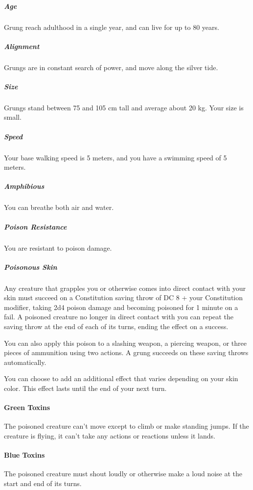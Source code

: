     \subparagraph{Age} Grung reach adulthood in a single year, and can live for up to 80 years.

    \subparagraph{Alignment} %
    Grungs are in constant search of power, and move along the silver tide.

    \subparagraph{Size} Grungs stand between 75 and 105 cm tall and average about 20 kg.
    Your size is small.

    \subparagraph{Speed} Your base walking speed is 5 meters, and you have a swimming speed of 5 meters.

    \subparagraph{Amphibious} You can breathe both air and water.

    \subparagraph{Poison Resistance} You are resistant to poison damage.

    \subparagraph{Poisonous Skin} Any creature that grapples you or otherwise comes into direct contact with your skin must succeed on a Constitution saving throw of DC 8 + your Constitution modifier, taking 2d4 poison damage and becoming poisoned for 1 minute on a fail.
    A poisoned creature no longer in direct contact with you can repeat the saving throw at the end of each of its turns, ending the effect on a success.

    You can also apply this poison to a slashing weapon, a piercing weapon, or three pieces of ammunition using two actions.
    A grung succeeds on these saving throws automatically.

    You can choose to add an additional effect that varies depending on your skin color.
    This effect lasts until the end of your next turn.

        \paragraph{Green Toxins} The poisoned creature can't move except to climb or make standing jumps.
        If the creature is flying, it can't take any actions or reactions unless it lands.

        \paragraph{Blue Toxins} The poisoned creature must shout loudly or otherwise make a loud noise at the start and end of its turns.

